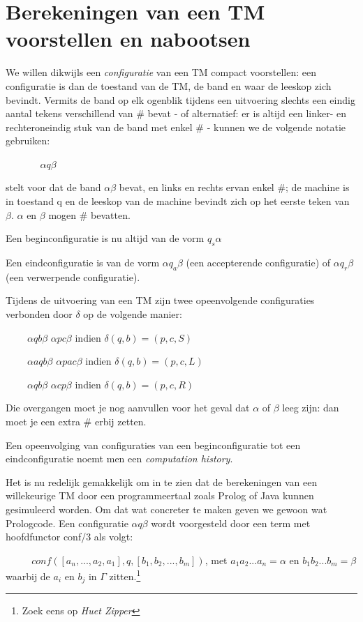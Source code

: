 \section{Berekeningen van een TM voorstellen en nabootsen}

We willen dikwijls een {\em configuratie} van een TM compact
voorstellen: een configuratie is dan de toestand van de TM, de band en
waar de leeskop zich bevindt. Vermits de band op elk ogenblik tijdens
een uitvoering slechts een eindig aantal tekens verschillend van \#
bevat - of alternatief: er is altijd een linker- en rechteroneindig
stuk van de band met enkel \# - kunnen we de volgende notatie
gebruiken:

$~~~~~~~~~~~~~~~~\alpha q \beta$

stelt voor dat de band $\alpha\beta$ bevat, en links
en rechts ervan enkel \#; de machine is in toestand q en de leeskop
van de machine bevindt zich op het eerste teken van $\beta$. $\alpha$
en $\beta$ mogen  \# bevatten. 

Een beginconfiguratie is nu altijd van de vorm $q_s\alpha$


Een eindconfiguratie is van de vorm $\alpha q_a \beta$ (een
accepterende configuratie) of
%
$\alpha q_r \beta$ (een verwerpende configuratie).


Tijdens de uitvoering van een TM zijn twee opeenvolgende configuraties
verbonden door $\delta$ op de volgende manier:


$~~~~~~~~~~\alpha q b \beta$ \rpijl $\alpha p c \beta$ indien $\delta(q,b) = (p,c,S)$

$~~~~~~~~~~\alpha a q b \beta$ \rpijl $\alpha p a c \beta$ indien $\delta(q,b) = (p,c,L)$

$~~~~~~~~~~\alpha q b \beta$ \rpijl $\alpha c p \beta$ indien $\delta(q,b) = (p,c,R)$


Die overgangen moet je nog aanvullen voor het geval dat $\alpha$ of
$\beta$ leeg zijn: dan moet je een extra \# erbij zetten.


Een opeenvolging van configuraties van een beginconfiguratie tot een
eindconfiguratie noemt men een {\em computation history}.


Het is nu redelijk gemakkelijk om in te zien dat de berekeningen van
een willekeurige TM door een programmeertaal zoals Prolog of Java
kunnen gesimuleerd worden. Om dat wat concreter te maken geven we
gewoon wat Prologcode. Een configuratie $\alpha q \beta$ wordt
voorgesteld door een term met hoofdfunctor conf/3 als volgt:

$~~~~~~~~~~~~conf([a_n, ... , a_2,a_1],q,[b_1,b_2,...,b_m])$, met 
$a_1a_2...a_n = \alpha$ en $b_1b_2...b_m = \beta$
%
\\ waarbij de $a_i$ en $b_j$ in $\Gamma$ zitten.\footnote{Zoek eens op {\em Huet Zipper}}


